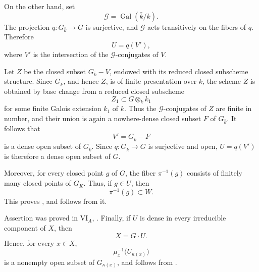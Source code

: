 On the other hand, set
\[
  \mathscr G=\operatorname{Gal}(\bar{k}/k).
\]
The projection \(q:G_{\bar{k}}\to G\) is surjective, and
\(\mathscr G\) acts transitively on the fibers of \(q\).
Therefore
\[
  U=q(V'),
\]
where \(V'\) is the intersection of the
\(\mathscr G\)-conjugates of \(V\).

Let \(Z\) be the closed subset \(G_{\bar{k}}-V\), endowed with
its reduced closed subscheme structure. Since \(G_{\bar{k}}\),
and hence \(Z\), is of finite presentation over \(\bar{k}\), the
scheme \(Z\) is obtained by base change from a reduced closed
subscheme
\[
  Z_1\subset G\otimes_k k_1
\]
for some finite Galois extension \(k_1\) of \(k\). Thus the
\(\mathscr G\)-conjugates of \(Z\) are finite in number, and their
union is again a nowhere-dense closed subset \(F\) of
\(G_{\bar{k}}\). It follows that
\[
  V'=G_{\bar{k}}-F
\]
is a dense open subset of \(G_{\bar{k}}\). Since
\(q:G_{\bar{k}}\to G\) is surjective and open, \(U=q(V')\) is
therefore a dense open subset of \(G\).

Moreover, for every closed point \(g\) of \(G\), the fiber
\(\pi^{-1}(g)\) consists of finitely many closed points of \(G_K\).
Thus, if \(g\in U\), then
\[
  \pi^{-1}(g)\subset W.
\]
This proves \textup{}, and \textup{} follows from it.

Assertion \textup{} was proved in VI\(_A\), .
Finally, if \(U\) is dense in every irreducible component of
\(X\), then
\[
  X=G\cdot U.
\]
Hence, for every \(x\in X\),
\[
  \mu_x^{-1}\bigl(U_{\kappa(x)}\bigr)
\]
is a nonempty open subset of \(G_{\kappa(x)}\), and
\textup{} follows from \textup{}.
